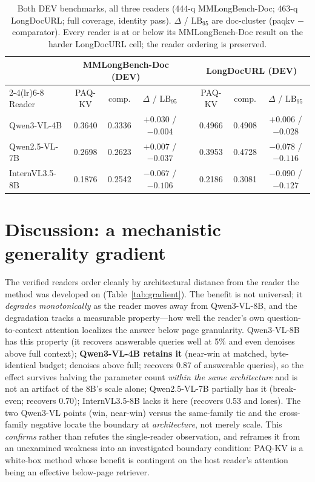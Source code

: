 \documentclass[letterpaper]{article} %
\newcommand{\paqc}{\textsc{PAQ-KV}}
\newcommand{\lb}{\mathrm{LB}_{95}}
\begin{document}
\begin{table}[t]
\centering
\caption{Both DEV benchmarks, all three readers (444-q MMLongBench-Doc; 463-q LongDocURL; full coverage, identity
pass). $\Delta$ / $\lb$ are doc-cluster (paqkv $-$ comparator). Every reader is at or below its MMLongBench-Doc result
on the harder LongDocURL cell; the reader ordering is preserved.}
\label{tab:longdocurl}
\small
\begin{tabular}{@{}lccc c ccc@{}}
\toprule
& \multicolumn{3}{c}{MMLongBench-Doc (DEV)} & & \multicolumn{3}{c}{LongDocURL (DEV)} \\
\cmidrule(lr){2-4}\cmidrule(lr){6-8}
Reader & \paqc{} & comp. & $\Delta$ / $\lb$ & & \paqc{} & comp. & $\Delta$ / $\lb$ \\
\midrule
Qwen3-VL-4B    & 0.3640 & 0.3336 & $+0.030$ / $-0.004$ & & 0.4966 & 0.4908 & $+0.006$ / $-0.028$ \\
Qwen2.5-VL-7B  & 0.2698 & 0.2623 & $+0.007$ / $-0.037$ & & 0.3953 & 0.4728 & $-0.078$ / $-0.116$ \\
InternVL3.5-8B & 0.1876 & 0.2542 & $-0.067$ / $-0.106$ & & 0.2186 & 0.3081 & $-0.090$ / $-0.127$ \\
\bottomrule
\end{tabular}
\end{table}

\section{Discussion: a mechanistic generality gradient}
\label{sec:discussion}
The verified readers order cleanly by architectural distance from the reader the method was developed on
(Table~\ref{tab:gradient}). The benefit is not universal; it \emph{degrades monotonically} as the reader moves away
from Qwen3-VL-8B, and the degradation tracks a measurable property---how well the reader's own question-to-context
attention localizes the answer below page granularity. Qwen3-VL-8B has this property (it recovers answerable queries
well at 5\% and even denoises above full context); \textbf{Qwen3-VL-4B retains it} (near-win at matched, byte-identical
budget; denoises above full; recovers 0.87 of answerable queries), so the effect survives halving the parameter count
\emph{within the same architecture} and is not an artifact of the 8B's scale alone; Qwen2.5-VL-7B partially has it
(break-even; recovers 0.70); InternVL3.5-8B lacks it here (recovers 0.53 and loses). The two Qwen3-VL points (win,
near-win) versus the same-family tie and the cross-family negative locate the boundary at \emph{architecture}, not
merely scale. This \emph{confirms} rather than refutes the single-reader observation, and reframes it from an
unexamined weakness into an investigated boundary condition: \paqc{} is a white-box method whose benefit is contingent
on the host reader's attention being an effective below-page retriever.
\end{document}
